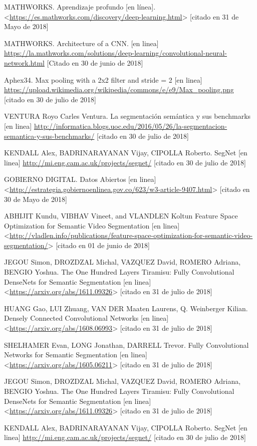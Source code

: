 MATHWORKS. Aprendizaje profundo [en línea]. <\url{https://es.mathworks.com/discovery/deep-learning.html}> [citado en 31 de Mayo de 2018]

MATHWORKS. Architecture of a CNN. [en linea] \url{https://la.mathworks.com/solutions/deep-learning/convolutional-neural-network.html} [Citado en 30 de junio de 2018]

Aphex34. Max pooling with a 2x2 filter and stride = 2 [en linea] \url{https://upload.wikimedia.org/wikipedia/commons/e/e9/Max_pooling.png} [citado en 30 de julio de 2018]

VENTURA Royo Carles Ventura. La segmentación semántica y sus benchmarks [en linea] \url{http://informatica.blogs.uoc.edu/2016/05/26/la-segmentacion-semantica-y-sus-benchmarks/} [citado en 30 de julio de 2018]

KENDALL Alex, BADRINARAYANAN Vijay, CIPOLLA Roberto. SegNet [en linea] \url{http://mi.eng.cam.ac.uk/projects/segnet/} [citado en 30 de julio de 2018]

GOBIERNO DIGITAL. Datos Abiertos [en linea] <\url{http://estrategia.gobiernoenlinea.gov.co/623/w3-article-9407.html}> [citado en 30 de Mayo de 2018]

ABHIJIT Kundu, VIBHAV Vineet, and VLANDLEN Koltun Feature Space Optimization for Semantic Video Segmentation [en linea] <\url{http://vladlen.info/publications/feature-space-optimization-for-semantic-video-segmentation/}> [citado en 01 de junio de 2018]

JEGOU Simon, DROZDZAL Michal, VAZQUEZ David, ROMERO Adriana, BENGIO Yoshua. The One Hundred Layers Tiramisu: Fully Convolutional DenseNets for Semantic Segmentation [en linea] <\url{https://arxiv.org/abs/1611.09326}> [citado en 31 de julio de 2018]

HUANG Gao, LUI Zhuang, VAN DER Maaten Laurens, Q. Weinberger Kilian. Densely Connected Convolutional Networks [en linea] <\url{https://arxiv.org/abs/1608.06993}> [citado en 31 de julio de 2018]

SHELHAMER Evan, LONG Jonathan, DARRELL Trevor. Fully Convolutional Networks for Semantic Segmentation [en linea] <\url{https://arxiv.org/abs/1605.06211}> [citado en 31 de julio de 2018]

JEGOU Simon, DROZDZAL Michal, VAZQUEZ David, ROMERO Adriana, BENGIO Yoshua. The One Hundred Layers Tiramisu: Fully Convolutional DenseNets for Semantic Segmentation [en linea] <\url{https://arxiv.org/abs/1611.09326}> [citado en 31 de julio de 2018]

KENDALL Alex, BADRINARAYANAN Vijay, CIPOLLA Roberto. SegNet [en linea] \url{http://mi.eng.cam.ac.uk/projects/segnet/} [citado en 30 de julio de 2018]

